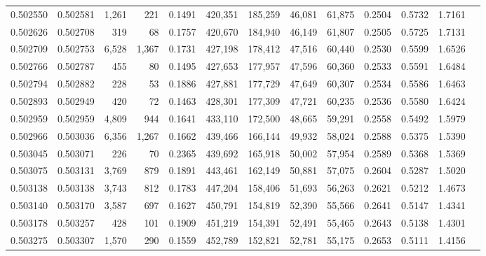 \begin{tabular}{rrrrrrrrrrrrr}
0.502550 & 0.502581 & 1,261 &   221 &                                     0.1491 & 420,351 & 185,259 &  46,081 &  61,875 & 0.2504 & 0.5732 & 1.7161 \\
0.502626 & 0.502708 &   319 &    68 &                                     0.1757 & 420,670 & 184,940 &  46,149 &  61,807 & 0.2505 & 0.5725 & 1.7131 \\
0.502709 & 0.502753 & 6,528 & 1,367 &                                     0.1731 & 427,198 & 178,412 &  47,516 &  60,440 & 0.2530 & 0.5599 & 1.6526 \\
0.502766 & 0.502787 &   455 &    80 &                                     0.1495 & 427,653 & 177,957 &  47,596 &  60,360 & 0.2533 & 0.5591 & 1.6484 \\
0.502794 & 0.502882 &   228 &    53 &                                     0.1886 & 427,881 & 177,729 &  47,649 &  60,307 & 0.2534 & 0.5586 & 1.6463 \\
0.502893 & 0.502949 &   420 &    72 &                                     0.1463 & 428,301 & 177,309 &  47,721 &  60,235 & 0.2536 & 0.5580 & 1.6424 \\
0.502959 & 0.502959 & 4,809 &   944 &                                     0.1641 & 433,110 & 172,500 &  48,665 &  59,291 & 0.2558 & 0.5492 & 1.5979 \\
0.502966 & 0.503036 & 6,356 & 1,267 &                                     0.1662 & 439,466 & 166,144 &  49,932 &  58,024 & 0.2588 & 0.5375 & 1.5390 \\
0.503045 & 0.503071 &   226 &    70 &                                     0.2365 & 439,692 & 165,918 &  50,002 &  57,954 & 0.2589 & 0.5368 & 1.5369 \\
0.503075 & 0.503131 & 3,769 &   879 &                                     0.1891 & 443,461 & 162,149 &  50,881 &  57,075 & 0.2604 & 0.5287 & 1.5020 \\
0.503138 & 0.503138 & 3,743 &   812 &                                     0.1783 & 447,204 & 158,406 &  51,693 &  56,263 & 0.2621 & 0.5212 & 1.4673 \\
0.503140 & 0.503170 & 3,587 &   697 &                                     0.1627 & 450,791 & 154,819 &  52,390 &  55,566 & 0.2641 & 0.5147 & 1.4341 \\
0.503178 & 0.503257 &   428 &   101 &                                     0.1909 & 451,219 & 154,391 &  52,491 &  55,465 & 0.2643 & 0.5138 & 1.4301 \\
0.503275 & 0.503307 & 1,570 &   290 &                                     0.1559 & 452,789 & 152,821 &  52,781 &  55,175 & 0.2653 & 0.5111 & 1.4156 \\

\end{tabular}
